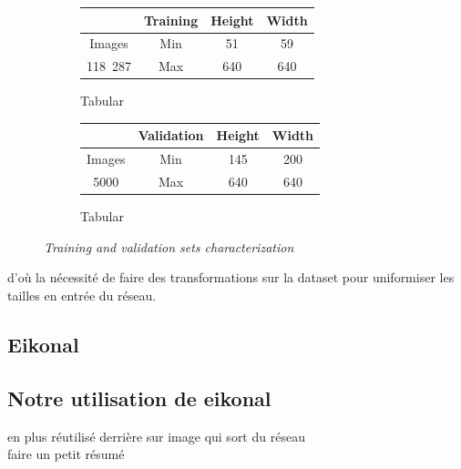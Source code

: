 \documentclass{article}
\begin{document}
\begin{figure}[!ht]
            \bigskip

            \begin{subfigure}{.49\linewidth}
                \center
                \begin{tabular}{|c||c|c|c|}
                    \hline
                     & Training & Height & Width \\
                    \hline
                    \hline
                    Images & Min & 51 & 59 \\
                    \hline
                    118~287 & Max & 640 & 640 \\
                    \hline
                \end{tabular}
                \caption{Tabular}
            \end{subfigure}
            \begin{subfigure}{.49\linewidth}
                \center
                \begin{tabular}{|c||c|c|c|}
                    \hline
                     & Validation & Height & Width \\
                    \hline
                    \hline
                    Images & Min & 145 & 200 \\
                    \hline
                    5000 & Max & 640 & 640 \\
                    \hline
                \end{tabular}
                \caption{Tabular}
            \end{subfigure}
            \caption{\textit{Training and validation sets characterization}}
        \end{figure}

        d'où la nécessité de faire des transformations sur la dataset pour uniformiser les tailles en entrée du réseau.

    \subsection{Eikonal}
    \subsection{Notre utilisation de eikonal}
    en plus réutilisé derrière sur image qui sort du réseau\\
    faire un petit résumé
\end{document}
